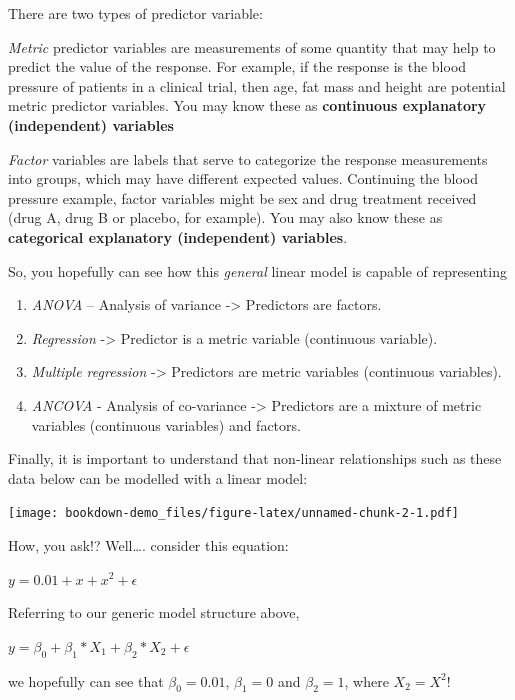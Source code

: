 \documentclass[
]{book}
\providecommand{\tightlist}{%
  \setlength{\itemsep}{0pt}\setlength{\parskip}{0pt}}
\begin{document}
There are two types of predictor variable:

\emph{Metric} predictor variables are measurements of some quantity that may help to predict the value of the response. For example, if the response is the blood pressure of patients in a clinical trial, then age, fat mass and height are potential metric predictor variables. You may know these as \textbf{continuous explanatory (independent) variables}

\emph{Factor} variables are labels that serve to categorize the response measurements into groups, which may have different expected values. Continuing the blood pressure example, factor variables might be sex and drug treatment received (drug A, drug B or placebo, for example). You may also know these as \textbf{categorical explanatory (independent) variables}.

So, you hopefully can see how this \emph{general} linear model is capable of representing

\begin{enumerate}
\def\labelenumi{\arabic{enumi}.}
\tightlist
\item
  \emph{ANOVA} -- Analysis of variance -\textgreater{} Predictors are factors.
\item
  \emph{Regression} -\textgreater{} Predictor is a metric variable (continuous variable).\\
\item
  \emph{Multiple regression} -\textgreater{} Predictors are metric variables (continuous variables).
\item
  \emph{ANCOVA} - Analysis of co-variance -\textgreater{} Predictors are a mixture of metric variables (continuous variables) and factors.
\end{enumerate}

Finally, it is important to understand that non-linear relationships such as these data below can be modelled with a linear model:

\texttt{[image: bookdown-demo\_files/figure-latex/unnamed-chunk-2-1.pdf]}

How, you ask!? Well\ldots. consider this equation:

\(y = 0.01 + x + x^{2} + \epsilon\)

Referring to our generic model structure above,

\(y = \beta_{0}+\beta_{1}*X_{1}+\beta_{2}*X_{2}+\epsilon\)

we hopefully can see that \(\beta_{0} = 0.01\), \(\beta_{1} = 0\) and \(\beta_{2} = 1\), where \(X_{2} = X^{2}\)!
\end{document}
